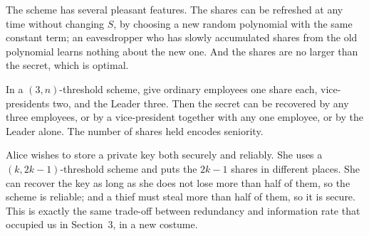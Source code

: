\begin{remark}
	The scheme has several pleasant features. The shares can be refreshed at any time without changing $S$, by choosing a new random polynomial with the same constant term; an eavesdropper who has slowly accumulated shares from the old polynomial learns nothing about the new one. And the shares are no larger than the secret, which is optimal.
\end{remark}

\begin{example}
	In a $(3,n)$-threshold scheme, give ordinary employees one share each, vice-presidents two, and the Leader three. Then the secret can be recovered by any three employees, or by a vice-president together with any one employee, or by the Leader alone. The number of shares held encodes seniority.
\end{example}

\begin{example}
	Alice wishes to store a private key both securely and reliably. She uses a $(k,2k-1)$-threshold scheme and puts the $2k-1$ shares in different places. She can recover the key as long as she does not lose more than half of them, so the scheme is reliable; and a thief must steal more than half of them, so it is secure. This is exactly the same trade-off between redundancy and information rate that occupied us in Section~3, in a new costume.
\end{example}

